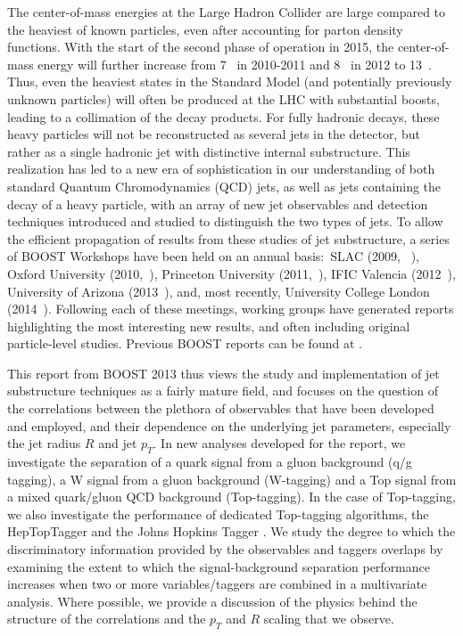 The center-of-mass energies at the Large Hadron Collider are large compared to the heaviest of known particles, even after accounting for parton density functions. With the start of the second phase of operation in 2015, the center-of-mass energy will further increase from 7~\tev{} in 2010-2011 and 8~\tev{} in 2012 to 13~\tev{}. Thus, even the heaviest states in the Standard Model (and potentially previously unknown particles) will often be 
produced at the LHC with
substantial boosts, leading to a collimation of the decay products.  For fully hadronic decays, these heavy particles will not be reconstructed as several jets in the detector, but rather
as a single hadronic jet with distinctive internal substructure.  This realization has led to a new era of sophistication
in our understanding of both standard Quantum Chromodynamics (QCD) jets, as well as jets containing the decay of a heavy particle, with an array
of new jet observables and detection techniques introduced and studied to distinguish the two types of jets.  To allow the efficient propagation of 
results from these studies of jet substructure, a series of BOOST Workshops have been held on an annual basis:~SLAC (2009, ~\cite{Boost:2009xx}), 
Oxford University (2010,~\cite{Boost:2010xx}), Princeton 
University  (2011,~\cite{Boost:2011xx}), IFIC Valencia (2012~\cite{Boost:2012xx}), 
University of Arizona (2013~\cite{Boost:2013xx}), and, most recently, University College London (2014~\cite{Boost:2014xx}).
Following each of these meetings, working groups have generated reports
highlighting the most interesting new results, and often including original particle-level studies. Previous BOOST reports
can be found at \cite{Abdesselam:2010pt,Altheimer:2012mn,Altheimer:2013yza}.

This report from BOOST 2013 thus views the study and implementation of jet substructure techniques as a fairly
mature field, and focuses on the question of the correlations between the plethora of observables that have been developed 
and employed, and their dependence on the underlying jet parameters, especially the jet radius $R$ and jet $p_T$. 
In new analyses developed for the report, we investigate the separation of a quark signal from a gluon background (q/g tagging), a W signal from a gluon background (W-tagging) and a Top signal from a mixed quark/gluon QCD background (Top-tagging). In the case of Top-tagging, we also investigate the performance of dedicated Top-tagging algorithms, the HepTopTagger \cite{Plehn:2010st} and the Johns Hopkins Tagger \cite{Kaplan:2008ie}. We study the degree to which the discriminatory information provided by the observables and taggers overlaps by examining the extent to which the signal-background separation performance increases when two or more variables/taggers are combined in a multivariate analysis. Where possible, we provide a discussion of the physics behind the structure of the correlations and the $p_{T}$ and $R$ scaling that we observe. 


